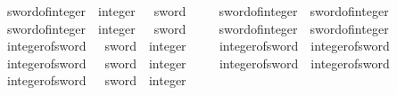 \begin{isabellebody}
\ sword{}{}{\isacharunderscore}{\kern0pt}of{\isacharunderscore}{\kern0pt}integer\ {\isacharcolon}{\kern0pt}{\isacharcolon}{\kern0pt}\ {\isachardoublequoteopen}integer\ {\isasymRightarrow}\ {}{}\ sword{\isachardoublequoteclose}\isanewline
\ \ \isanewline
\ \ {\isachardoublequoteopen}sword{}{}{\isacharunderscore}{\kern0pt}of{\isacharunderscore}{\kern0pt}integer\ {\isasymequiv}\ sword{\isacharunderscore}{\kern0pt}of{\isacharunderscore}{\kern0pt}integer{\isachardoublequoteclose}\isanewline
\isanewline
{}\isamarkupfalse%
\ sword{}{}{\isacharunderscore}{\kern0pt}of{\isacharunderscore}{\kern0pt}integer\ {\isacharcolon}{\kern0pt}{\isacharcolon}{\kern0pt}\ {\isachardoublequoteopen}integer\ {\isasymRightarrow}\ {}{}\ sword{\isachardoublequoteclose}\isanewline
\ \ \isanewline
\ \ {\isachardoublequoteopen}sword{}{}{\isacharunderscore}{\kern0pt}of{\isacharunderscore}{\kern0pt}integer\ {\isasymequiv}\ sword{\isacharunderscore}{\kern0pt}of{\isacharunderscore}{\kern0pt}integer{\isachardoublequoteclose}\isanewline
\isanewline
{}\isamarkupfalse%
\ integer{\isacharunderscore}{\kern0pt}of{\isacharunderscore}{\kern0pt}sword{}\ {\isacharcolon}{\kern0pt}{\isacharcolon}{\kern0pt}\ {\isachardoublequoteopen}{}\ sword\ {\isasymRightarrow}\ integer{\isachardoublequoteclose}\isanewline
\ \ \isanewline
\ \ {\isachardoublequoteopen}integer{\isacharunderscore}{\kern0pt}of{\isacharunderscore}{\kern0pt}sword{}\ {\isasymequiv}\ integer{\isacharunderscore}{\kern0pt}of{\isacharunderscore}{\kern0pt}sword{\isachardoublequoteclose}\isanewline
\isanewline
{}\isamarkupfalse%
\ integer{\isacharunderscore}{\kern0pt}of{\isacharunderscore}{\kern0pt}sword{}{}\ {\isacharcolon}{\kern0pt}{\isacharcolon}{\kern0pt}\ {\isachardoublequoteopen}{}{}\ sword\ {\isasymRightarrow}\ integer{\isachardoublequoteclose}\isanewline
\ \ \isanewline
\ \ {\isachardoublequoteopen}integer{\isacharunderscore}{\kern0pt}of{\isacharunderscore}{\kern0pt}sword{}{}\ {\isasymequiv}\ integer{\isacharunderscore}{\kern0pt}of{\isacharunderscore}{\kern0pt}sword{\isachardoublequoteclose}\isanewline
\isanewline
{}\isamarkupfalse%
\ integer{\isacharunderscore}{\kern0pt}of{\isacharunderscore}{\kern0pt}sword{}{}\ {\isacharcolon}{\kern0pt}{\isacharcolon}{\kern0pt}\ {\isachardoublequoteopen}{}{}\ sword\ {\isasymRightarrow}\ integer{\isachardoublequoteclose}\isanewline

\end{isabellebody}
